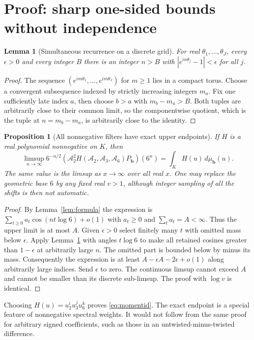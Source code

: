 \documentclass[11pt]{article}
\newtheorem{lemma}[theorem]{Lemma}
\newtheorem{proposition}[theorem]{Proposition}
\theoremstyle{remark}\newtheorem{remark}[theorem]{Remark}
\newcommand{\limsupn}{\limsup_{n\to\infty}}
\newcommand{\A}{\mathcal A}
\newcommand{\bb}{\boldsymbol b}
\begin{document}
\section{Proof: sharp one-sided bounds without independence}
\begin{lemma}[Simultaneous recurrence on a discrete grid]\label{lem:recurrence}
For real $\theta_1,\ldots,\theta_J$, every $\epsilon>0$ and every integer $B$ there is an integer $n>B$ with $|e^{in\theta_j}-1|<\epsilon$ for all $j$.
\end{lemma}
\begin{proof}
The sequence $(e^{im\theta_1},\ldots,e^{im\theta_J})$ for $m\ge1$ lies in a compact torus. Choose a convergent subsequence indexed by strictly increasing integers $m_a$. Fix one sufficiently late index $a$, then choose $b>a$ with $m_b-m_a>B$. Both tuples are arbitrarily close to their common limit, so the componentwise quotient, which is the tuple at $n=m_b-m_a$, is arbitrarily close to the identity.
\end{proof}
\begin{proposition}[All nonnegative filters have exact upper endpoints]\label{prop:endpoint}
If $H$ is a real polynomial nonnegative on $K$, then
\begin{equation}\label{eq:sharp}
 \limsupn 6^{-n/2}(\A_2^2 H(\A_2,\A_3,\A_6)P_{\bb})(6^n)
 =\int_K H(u)\,d\mu_{\bb}(u).
\end{equation}
The same value is the limsup as $x\to\infty$ over all real $x$. One may replace the geometric base $6$ by any fixed real $v>1$, although integer sampling of all the shifts is then not automatic.
\end{proposition}
\begin{proof}
By Lemma~\ref{lem:formula} the expression is $\sum_{t\ge0} a_t\cos(nt\log6)+o(1)$ with $a_t\ge0$ and $\sum_t a_t=A<\infty$. Thus the upper limit is at most $A$. Given $\epsilon>0$ select finitely many $t$ with omitted mass below $\epsilon$. Apply Lemma~\ref{lem:recurrence} with angles $t\log6$ to make all retained cosines greater than $1-\epsilon$ at arbitrarily large $n$. The omitted part is bounded below by minus its mass. Consequently the expression is at least $A-\epsilon A-2\epsilon+o(1)$ along arbitrarily large indices. Send $\epsilon$ to zero. The continuous limsup cannot exceed $A$ and cannot be smaller than its discrete sub-limsup. The proof with $\log v$ is identical.
\end{proof}
Choosing $H(u)=u_2^i u_3^j u_6^k$ proves \eqref{eq:momentid}. The exact endpoint is a special feature of nonnegative spectral weights. It would not follow from the same proof for arbitrary signed coefficients, such as those in an untwisted-minus-twisted difference.
\end{document}

